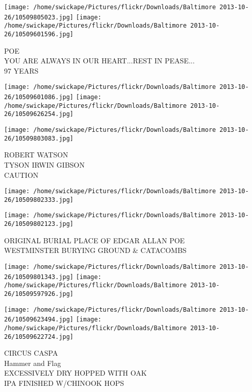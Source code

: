 \documentclass[10pt,letterpaper]{article}
\begin{document}
\vspace{0.25in}
\texttt{[image: /home/swickape/Pictures/flickr/Downloads/Baltimore 2013-10-26/10509805023.jpg]}
\texttt{[image: /home/swickape/Pictures/flickr/Downloads/Baltimore 2013-10-26/10509601596.jpg]}

POE\\
YOU ARE ALWAYS IN OUR HEART...REST IN PEASE...\\
97 YEARS\\
\pagebreak

\texttt{[image: /home/swickape/Pictures/flickr/Downloads/Baltimore 2013-10-26/10509601086.jpg]}
\texttt{[image: /home/swickape/Pictures/flickr/Downloads/Baltimore 2013-10-26/10509626254.jpg]}

\vspace{0.25in}
\texttt{[image: /home/swickape/Pictures/flickr/Downloads/Baltimore 2013-10-26/10509803083.jpg]}

ROBERT WATSON\\
TYSON IRWIN GIBSON\\
CAUTION\\
\pagebreak

\texttt{[image: /home/swickape/Pictures/flickr/Downloads/Baltimore 2013-10-26/10509802333.jpg]}

\vspace{0.25in}
\texttt{[image: /home/swickape/Pictures/flickr/Downloads/Baltimore 2013-10-26/10509802123.jpg]}

ORIGINAL BURIAL PLACE OF EDGAR ALLAN POE\\
WESTMINSTER BURYING GROUND \& CATACOMBS\\
\pagebreak

\texttt{[image: /home/swickape/Pictures/flickr/Downloads/Baltimore 2013-10-26/10509801343.jpg]}
\texttt{[image: /home/swickape/Pictures/flickr/Downloads/Baltimore 2013-10-26/10509597926.jpg]}

\texttt{[image: /home/swickape/Pictures/flickr/Downloads/Baltimore 2013-10-26/10509623494.jpg]}
\texttt{[image: /home/swickape/Pictures/flickr/Downloads/Baltimore 2013-10-26/10509622724.jpg]}

CIRCUS CASPA\\
Hammer and Flag\\
EXCESSIVELY DRY HOPPED WITH OAK\\
IPA FINISHED W/CHINOOK HOPS\\
\pagebreak
\end{document}
